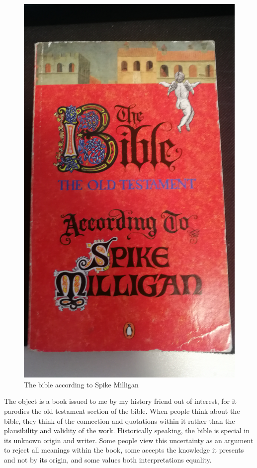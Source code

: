 \documentclass[a4paper,12pt]{article}
\begin{document}
\begin{figure}[h!]
 \centering
 \includegraphics[scale=0.05]{bible.jpg}
 \caption{The bible according to Spike Milligan}
 \label{fig:bible}
\end{figure}

The object is a book issued to me by my history friend out of interest, for it parodies the old testament section of the bible. When people think about the bible, they think of the connection and quotations within it rather than the plausibility and validity of the work. Historically speaking, the bible is special in its unknown origin and writer. Some people view this uncertainty as an argument to reject all meanings within the book, some accepts the knowledge it presents and not by its origin, and some values both interpretations equality.
\end{document}
